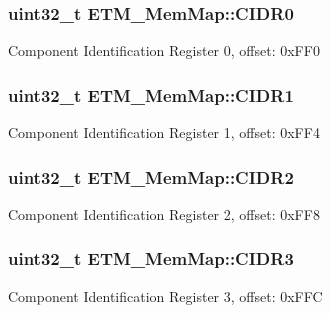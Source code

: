 \subsubsection[{C\+I\+D\+R0}]{\setlength{\rightskip}{0pt plus 5cm}uint32\+\_\+t E\+T\+M\+\_\+\+Mem\+Map\+::\+C\+I\+D\+R0}\label{struct_e_t_m___mem_map_a289eea9e2103e42ed73809a60b78a83c}
Component Identification Register 0, offset\+: 0x\+F\+F0 \hypertarget{struct_e_t_m___mem_map_abc79da95babee680c540cbbc4cfa35fe}{}
\subsubsection[{C\+I\+D\+R1}]{\setlength{\rightskip}{0pt plus 5cm}uint32\+\_\+t E\+T\+M\+\_\+\+Mem\+Map\+::\+C\+I\+D\+R1}\label{struct_e_t_m___mem_map_abc79da95babee680c540cbbc4cfa35fe}
Component Identification Register 1, offset\+: 0x\+F\+F4 \hypertarget{struct_e_t_m___mem_map_ad374b6ac57c02483f0c5a5ad2db6dd5e}{}
\subsubsection[{C\+I\+D\+R2}]{\setlength{\rightskip}{0pt plus 5cm}uint32\+\_\+t E\+T\+M\+\_\+\+Mem\+Map\+::\+C\+I\+D\+R2}\label{struct_e_t_m___mem_map_ad374b6ac57c02483f0c5a5ad2db6dd5e}
Component Identification Register 2, offset\+: 0x\+F\+F8 \hypertarget{struct_e_t_m___mem_map_a9c6bb1acae3c766482e230468863dcd6}{}
\subsubsection[{C\+I\+D\+R3}]{\setlength{\rightskip}{0pt plus 5cm}uint32\+\_\+t E\+T\+M\+\_\+\+Mem\+Map\+::\+C\+I\+D\+R3}\label{struct_e_t_m___mem_map_a9c6bb1acae3c766482e230468863dcd6}
Component Identification Register 3, offset\+: 0x\+F\+F\+C \hypertarget{struct_e_t_m___mem_map_a7e03dd9e31abcfe824f7b81b3cd4207f}{}
